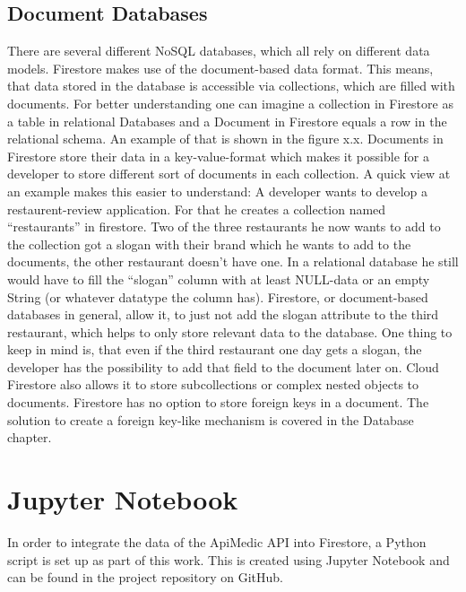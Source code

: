 \subsection{Document Databases}
There are several different NoSQL databases, which all rely on different data models. Firestore makes use of the document-based data format. This means, that data stored in the database is accessible via collections, which are filled with documents. For better understanding one can imagine a collection in Firestore as a table in relational Databases and a Document in Firestore equals a row in the relational schema. An example of that is shown in the figure x.x. Documents in Firestore store their data in a key-value-format which makes it possible for a developer to store different sort of documents in each collection. A quick view at an example makes this easier to understand: A developer wants to develop a restaurent-review application. For that he creates a collection named “restaurants” in firestore. Two of the three restaurants he now wants to add to the collection got a slogan with their brand which he wants to add to the documents, the other restaurant doesn’t have one. In a relational database he still would have to fill the “slogan” column with at least NULL-data or an empty String (or whatever datatype the column has). Firestore, or document-based databases in general, allow it, to just not add the slogan attribute to the third restaurant, which helps to only store relevant data to the database. One thing to keep in mind is, that even if the third restaurant one day gets a slogan, the developer has the possibility to add that field to the document later on. Cloud Firestore also allows it to store subcollections or complex nested objects to documents. Firestore has no option to store 
foreign keys in a document. The solution to create a foreign key-like mechanism is covered in the Database chapter. 

\section{Jupyter Notebook}
In order to integrate the data of the ApiMedic API into Firestore, a Python script is set up as part of this work. This is created using Jupyter Notebook and can be found in the project repository on GitHub.